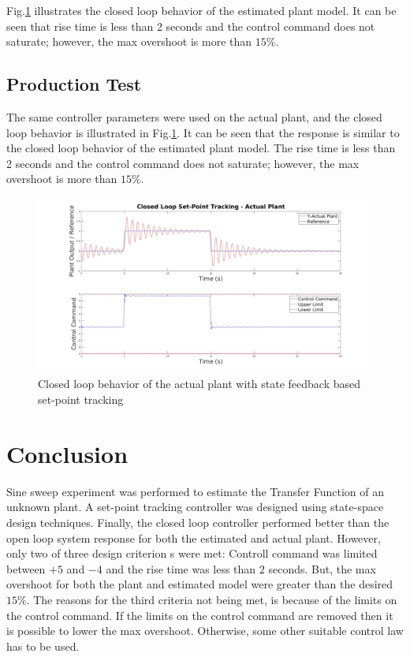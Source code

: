 \documentclass[11pt,usenames]{article}
\begin{document}
Fig.\ref{fig:ClosedLoop_Production_OutputRef} illustrates the closed loop behavior of the estimated plant model. It can be seen that rise time is less than 2 seconds and the control command does not saturate; however, the max overshoot is more than $15\%$.

\subsection{Production Test}

The same controller parameters were used on the actual plant, and the closed loop behavior is illustrated in Fig.\ref{fig:ClosedLoop_Production_OutputRef}. It can be seen that the response is similar to the closed loop behavior of the estimated plant model. The rise time is less than 2 seconds and the control command does not saturate; however, the max overshoot is more than $15\%$.

\begin{figure}[htpb]
	\centering
	\includegraphics[width=0.85\columnwidth]{ClosedLoop_Production_OutputRef.jpg}
	\caption{Closed loop behavior of the actual plant with state feedback based set-point tracking}
	\label{fig:ClosedLoop_Production_OutputRef}
\end{figure}

\newpage
\section{Conclusion}

Sine sweep experiment was performed to estimate the Transfer Function of an unknown plant. A set-point tracking controller was designed using state-space design techniques. Finally, the closed loop controller performed better than the open loop system response for both the estimated and actual plant. However, only two of three design criterion s were met: Controll command was limited between $+5$ and $-4$ and the rise time was less than 2 seconds. But, the max overshoot for both the plant and estimated model were greater than the desired $15\%$. The reasons for the third criteria not being met, is because of the limits on the control command. If the limits on the control command are removed then it is possible to lower the max overshoot. Otherwise, some other suitable control law has to be used. 
\end{document}
